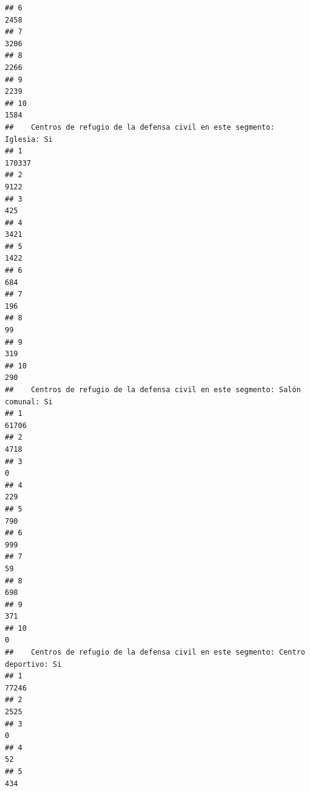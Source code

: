 \documentclass[11pt,]{article}
\begin{document}
\begin{verbatim}
## 6                                                                          2458
## 7                                                                          3206
## 8                                                                          2266
## 9                                                                          2239
## 10                                                                         1584
##    Centros de refugio de la defensa civil en este segmento: Iglesia: Si
## 1                                                                170337
## 2                                                                  9122
## 3                                                                   425
## 4                                                                  3421
## 5                                                                  1422
## 6                                                                   684
## 7                                                                   196
## 8                                                                    99
## 9                                                                   319
## 10                                                                  290
##    Centros de refugio de la defensa civil en este segmento: Salón comunal: Si
## 1                                                                       61706
## 2                                                                        4718
## 3                                                                           0
## 4                                                                         229
## 5                                                                         790
## 6                                                                         999
## 7                                                                          59
## 8                                                                         698
## 9                                                                         371
## 10                                                                          0
##    Centros de refugio de la defensa civil en este segmento: Centro deportivo: Si
## 1                                                                          77246
## 2                                                                           2525
## 3                                                                              0
## 4                                                                             52
## 5                                                                            434

\end{verbatim}
\end{document}
